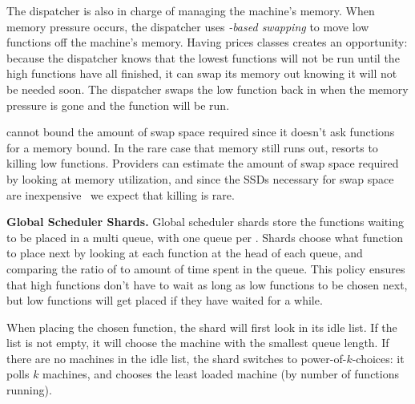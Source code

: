 The dispatcher is also in charge of managing the machine's memory. When memory
pressure occurs, the dispatcher uses \textit{\class{}-based swapping} to move
low \class{} functions off the machine's memory. Having prices classes
creates an opportunity: because the dispatcher knows that the lowest \class{}
functions will not be run until the high \class{} functions have all finished,
it can swap its memory out knowing it will not be needed soon. The dispatcher
swaps the low \class{} function back in when the memory pressure is gone and the
function will be run.

\Sys{} cannot bound the amount of swap space required since it doesn't ask
functions for a memory bound.  In the rare case that memory still runs out,
\sys{} resorts to killing low \class{} functions.  Providers can estimate the
amount of swap space required by looking at memory utilization, and since the
SSDs necessary for swap space are inexpensive~\cite{ssd-price} we expect that
killing is rare.

\textbf{Global Scheduler Shards.}
Global scheduler shards store the functions waiting to be placed in a multi
queue, with one queue per \priceclass{}. Shards choose what function to place
next by looking at each function at the head of each queue, and comparing the
ratio of \class{} to amount of time spent in the queue. This policy ensures
that high \class{} functions don't have to wait as long as low \class{}
functions to be chosen next, but low \class{} functions will get placed if they
have waited for a while.

When placing the chosen function, the shard will first look in its
idle list. If the list is not empty, it will choose the machine with
the smallest queue length.  If there are no machines in the idle list,
the shard switches to power-of-$k$-choices: it polls $k$ machines, and
chooses the least loaded machine (by number of functions running).
